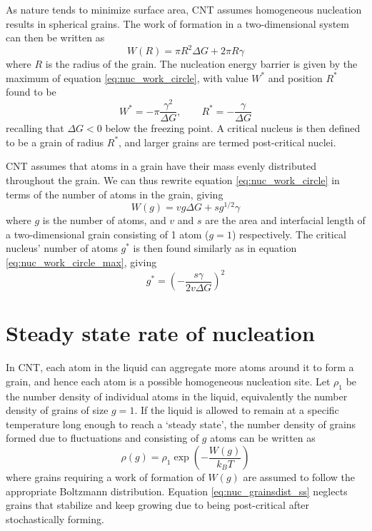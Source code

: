 As nature tends to minimize surface area, CNT assumes homogeneous nucleation results in spherical grains. The work of formation in a two-dimensional system can then be written as
\begin{equation}\label{eq:nuc_work_circle}
W(R) = \pi R^2\Delta G + 2\pi R \gamma
\end{equation}
where $R$ is the radius of the grain. The nucleation energy barrier is given by the maximum of equation \ref{eq:nuc_work_circle}, with value $W^*$ and position $R^*$ found to be
\begin{equation}\label{eq:nuc_work_circle_max}
W^* = -\pi\frac{\gamma^2}{\Delta G}, \qquad R^* = -\frac{\gamma}{\Delta G}
\end{equation}
recalling that $\Delta G <0$ below the freezing point. A critical nucleus is then defined to be a grain of radius $R^*$, and larger grains are termed post-critical nuclei.

CNT assumes that atoms in a grain have their mass evenly distributed throughout the grain. We can thus rewrite equation \ref{eq:nuc_work_circle} in terms of the number of atoms in the grain, giving
\begin{equation}\label{eq:nuc_work_g}
W(g) = vg\Delta G + sg^{1/2} \gamma
\end{equation}
where $g$ is the number of atoms, and $v$ and $s$ are the area and interfacial length of a two-dimensional grain consisting of 1 atom ($g=1$) respectively. The critical nucleus' number of atoms $g^*$ is then found similarly as in equation \ref{eq:nuc_work_circle_max}, giving
\begin{equation}\label{eq:nuc_crit_num_g}
g^* = \left(-\frac{s\gamma}{2v\Delta G}\right)^2
\end{equation}

\section{Steady state rate of nucleation}\label{sec:nuc_steadyrate}

In CNT, each atom in the liquid can aggregate more atoms around it to form a grain, and hence each atom is a possible homogeneous nucleation site. Let $\rho_1$ be the number density of individual atoms in the liquid, equivalently the number density of grains of size $g=1$. If the liquid is allowed to remain at a specific temperature long enough to reach a `steady state', the number density of grains formed due to fluctuations and consisting of $g$ atoms can be written as
\begin{equation}\label{eq:nuc_grainsdist_ss}
\rho(g) = \rho_1 \exp\left(-\frac{W(g)}{k_B T}\right)
\end{equation}
where grains requiring a work of formation of $W(g)$ are assumed to follow the appropriate Boltzmann distribution. Equation \ref{eq:nuc_grainsdist_ss} neglects grains that stabilize and keep growing due to being post-critical after stochastically forming.

